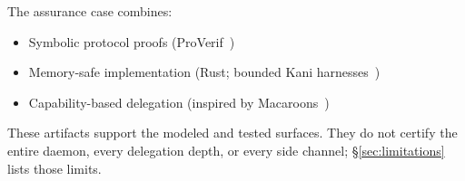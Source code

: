 \documentclass[11pt,a4paper]{article}
\theoremstyle{definition}
\begin{document}
The assurance case combines:

\begin{itemize}
  \item Symbolic protocol proofs (ProVerif~)
  \item Memory-safe implementation (Rust; bounded Kani harnesses~)
  \item Capability-based delegation (inspired by Macaroons~)
\end{itemize}

These artifacts support the modeled and tested surfaces. They do not certify the entire daemon, every delegation depth, or every side channel; \S\ref{sec:limitations} lists those limits.


\end{document}
